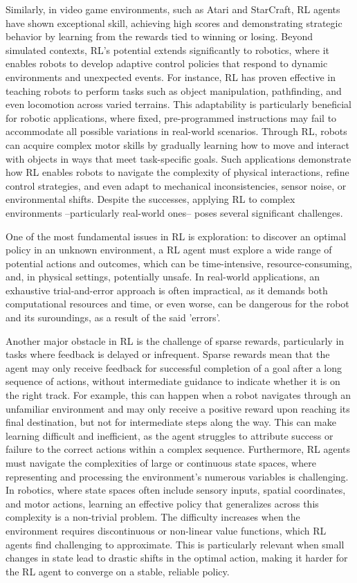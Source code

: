 Similarly, in video game environments, such as Atari and StarCraft, RL agents have shown exceptional skill, achieving
high scores and demonstrating strategic behavior by learning from the rewards tied to winning or losing.
Beyond simulated contexts, RL’s potential extends significantly to robotics, where it enables robots to develop
adaptive control policies that respond to dynamic environments and unexpected events.
For instance, RL has proven effective in teaching robots to perform tasks such as object manipulation, pathfinding, and
even locomotion across varied terrains.
This adaptability is particularly beneficial for robotic applications, where fixed, pre-programmed instructions may
fail to accommodate all possible variations in real-world scenarios.
Through RL, robots can acquire complex motor skills by gradually learning how to move and interact with objects in ways
that meet task-specific goals.
Such applications demonstrate how RL enables robots to navigate the complexity of physical interactions, refine control
strategies, and even adapt to mechanical inconsistencies, sensor noise, or environmental shifts.
Despite the successes, applying RL to complex environments --particularly real-world ones-- poses several significant
challenges.

One of the most fundamental issues in RL is exploration: to discover an optimal policy in an unknown environment,
a RL agent must explore a wide
range of potential actions and outcomes, which can be time-intensive, resource-consuming, and, in physical settings,
potentially unsafe.
In real-world applications, an exhaustive trial-and-error approach is often impractical, as it demands both
computational resources and time, or even worse, can be dangerous for the robot and its suroundings, as a result 
of the said 'errors'.

Another major obstacle in RL is the challenge of sparse rewards, particularly in tasks where feedback is delayed or
infrequent.
Sparse rewards mean that the agent may only receive feedback for successful completion of a goal after a long sequence
of actions, without intermediate guidance to indicate whether it is on the right track.
For example, this can happen when a robot navigates through an unfamiliar environment and may only receive a positive reward upon reaching its
final destination, but not for intermediate steps along the way.
This can make learning difficult and inefficient, as the agent struggles to attribute success or failure to the correct
actions within a complex sequence.
Furthermore, RL agents must navigate the complexities of large or continuous state spaces, where representing and
processing the environment’s numerous variables is challenging.
In robotics, where state spaces often include sensory inputs, spatial coordinates, and motor actions, learning an
effective policy that generalizes across this complexity is a non-trivial problem.
The difficulty increases when the environment requires discontinuous or non-linear value functions, which RL agents
find challenging to approximate.
This is particularly relevant when small changes in state lead to drastic shifts in the optimal action, making it
harder for the RL agent to converge on a stable, reliable policy.

